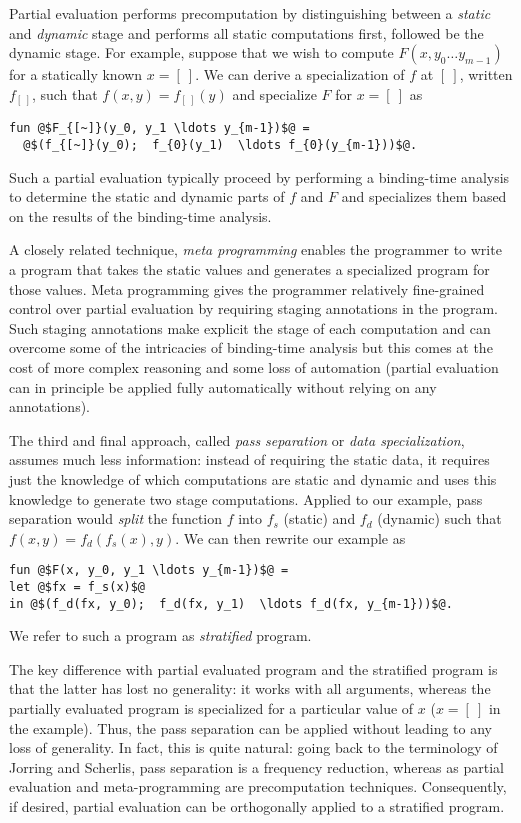 Partial evaluation performs precomputation by distinguishing between a
{\em static} and {\em dynamic} stage and performs all static
computations first, followed be the dynamic stage.  For example,
suppose that we wish to compute $F(x, y_0 \ldots y_{m-1})$ for a
statically known $x = [~]$.  We can derive a specialization of $f$ at
$[~]$, written $f_{[~]}$, such that $f(x,y) = f_{[~]}(y)$ and specialize $F$
for $x=[~]$ as
\begin{lstlisting}
fun @$F_{[~]}(y_0, y_1 \ldots y_{m-1})$@ = 
  @$(f_{[~]}(y_0);  f_{0}(y_1)  \ldots f_{0}(y_{m-1}))$@.
\end{lstlisting}
%
Such a partial evaluation typically proceed by performing a
binding-time analysis to determine the static and dynamic parts of $f$
and $F$ and specializes them based on the results of the binding-time
analysis.

A closely related technique, {\em meta programming} enables the
programmer to write a program that takes the static values and
generates a specialized program for those values.  Meta programming
gives the programmer relatively fine-grained control over partial
evaluation by requiring staging annotations in the program.  Such
staging annotations make explicit the stage of each computation and
can overcome some of the intricacies of binding-time analysis but this
comes at the cost of more complex reasoning and some loss of
automation (partial evaluation can in principle be applied fully
automatically without relying on any annotations).

The third and final approach, called {\em pass separation} or {\em
  data specialization}, assumes much less information: instead of
requiring the static data, it requires just the knowledge of which
computations are static and dynamic and uses this knowledge to
generate two stage computations. 
%
Applied to our example, pass separation would {\em split} the function
$f$ into $f_s$ (static) and $f_d$ (dynamic) such that $f(x,y) =
f_d(f_s(x),y)$.  We can then rewrite our example as
%
\begin{lstlisting}
fun @$F(x, y_0, y_1 \ldots y_{m-1})$@ = 
let @$fx = f_s(x)$@
in @$(f_d(fx, y_0);  f_d(fx, y_1)  \ldots f_d(fx, y_{m-1}))$@.
\end{lstlisting}
We refer to such a program as {\em stratified} program.

The key difference with partial evaluated program and the stratified
program is that the latter has lost no generality: it works with all
arguments, whereas the partially evaluated program is specialized for
a particular value of $x$ ($x = [~]$ in the example).  Thus, the pass
separation can be applied without leading to any loss of generality.
In fact, this is quite natural: going back to the terminology of
Jorring and Scherlis, pass separation is a frequency reduction,
whereas as partial evaluation and meta-programming are precomputation
techniques. Consequently, if desired, partial evaluation can be
orthogonally applied to a stratified program.




